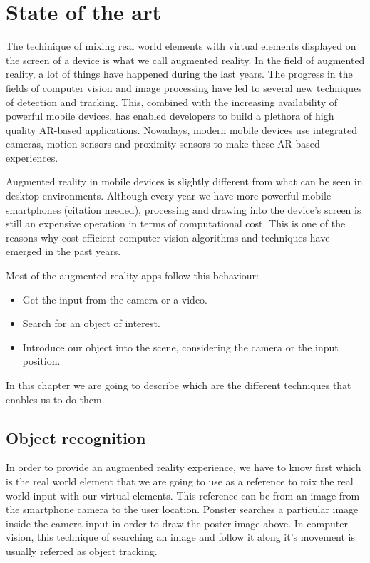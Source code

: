 \chapter{State of the art}
The techinique of
mixing real world elements with virtual elements displayed on the screen of a
device is what we call augmented reality. In the field of augmented reality, a
lot of things have happened during the last years. The progress in the fields
of computer vision and image processing have led to several new techniques of
detection and tracking. This, combined with the increasing availability of
powerful mobile devices, has enabled developers to build a plethora of high
quality AR-based applications. Nowadays, modern mobile devices use integrated
cameras, motion sensors and proximity sensors to make these AR-based experiences. 

Augmented reality in mobile devices is slightly different from what can be seen in
desktop environments. Although every year we have more powerful mobile smartphones
(citation needed), processing and drawing into the device's screen is still an
expensive operation in terms of computational cost. This is one of the reasons why
cost-efficient computer vision algorithms and techniques have emerged in the past
years. 

Most of the augmented reality apps follow this behaviour:
\begin{itemize}
\item Get the input from the camera or a video.
\item Search for an object of interest.
\item Introduce our object into the scene, considering the camera or the input position.
\end{itemize}

In this chapter we are going to describe which are the different techniques
that enables us to do them. 



\section{Object recognition}
In order to provide an augmented reality experience, we have to know first
which is the real world element that we are going to use as a reference to mix
the real world input with our virtual elements. This reference can be from an
image from the smartphone camera to the user location. Ponster searches a
particular image inside the camera input in order to draw the poster image above. In
computer vision, this technique of searching an image and follow it along it's
movement is usually referred as object tracking. 

